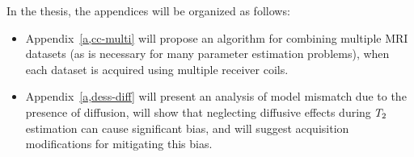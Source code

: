 In the thesis, the appendices will be organized as follows:
\begin{itemize}
\item
	Appendix~\ref{a,cc-multi} will propose an algorithm
	for combining multiple MRI datasets
	(as is necessary for many parameter estimation problems),
	when each dataset is acquired 
	using multiple receiver coils.
\item
	Appendix~\ref{a,dess-diff} will present an analysis
	of model mismatch due to the presence of diffusion,
	will show that neglecting diffusive effects
	during $T_2$ estimation 
	can cause significant bias,
	and will suggest acquisition modifications
	for mitigating this bias.
\end{itemize}
